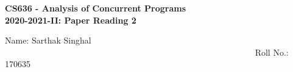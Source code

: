 \documentclass[20pt]{letter}
\begin{document}
\begin{center}
{\LARGE \textbf{
CS636 - Analysis of Concurrent Programs\\
2020-2021-II: Paper Reading 2
}}\end{center}

{\Large
Name: Sarthak Singhal        ~~~~~~~~~~~~~~~~~~~~~~~~~~~~~~~~~~~~~~~~~~~~~~~~~~~~~~~~~~   Roll No.: 170635\\\\}



\end{document}
